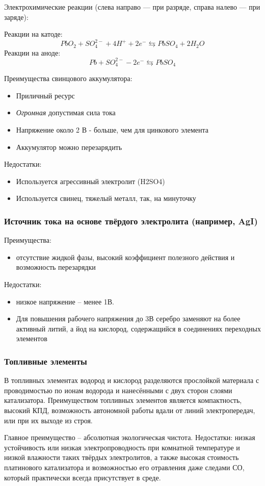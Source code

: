 \documentclass[14pt,a4paper]{scrartcl}
\begin{document}
Электрохимические реакции (слева направо — при разряде, справа налево — при заряде):

Реакции на катоде:
$$PbO_{2}+SO_{4}^{2-}+4H^{+}+2e^{-}\leftrightarrows PbSO_{4}+2H_{2}O$$
Реакции на аноде:
$$Pb+SO_{4}^{2-}-2e^{-}\leftrightarrows PbSO_{4}$$

Преимущества свинцового аккумулятора:
\begin{itemize}
 \item Приличный ресурс
 \item \emph{Огромная} допустимая сила тока
 \item Напряжение около 2 В - больше, чем для цинкового элемента
 \item Аккумулятор можно перезарядить
 \end{itemize}
 
 Недостатки:
 \begin{itemize}
 \item Используется агрессивный электролит (H2SO4)
 \item Используется свинец, тяжелый металл, так, на минуточку
\end{itemize}

\subsubsection*{Источник тока на основе твёрдого электролита (например, AgI)} 

Преимущества:
 \begin{itemize}
 \item отсутствие жидкой фазы, высокий коэффициент полезного действия и возможность перезарядки\end{itemize}
 
 Недостатки:
 \begin{itemize}
 \item низкое напряжение – менее 1В. 
 \item Для повышения рабочего напряжения до 3В серебро заменяют на более активный литий, а йод на кислород, содержащийся в соединениях переходных элементов
 \end{itemize}
 \subsubsection*{Топливные элементы}

В топливных элементах водород и кислород разделяются прослойкой материала с проводимостью по ионам водорода и нанесёнными с двух сторон слоями катализатора. Преимуществом топливных элементов является компактность, высокий КПД, возможность автономной работы вдали от линий электропередач, или при их выходе из строя. 

Главное преимущество – абсолютная экологическая чистота. Недостатки: низкая устойчивость или низкая электропроводность при комнатной температуре и низкой влажности таких твёрдых электролитов, а также высокая стоимость платинового катализатора и возможностью его отравления даже следами СО, который практически всегда присутствует в среде.
\end{document}
